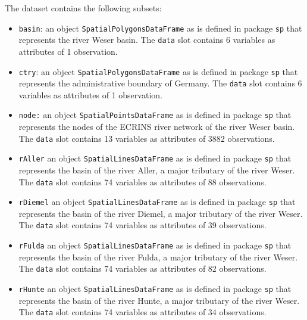 \documentclass{article}
\begin{document}
The dataset contains the following subsets:
\begin{itemize}
\item {\tt basin}: an object {\tt SpatialPolygonsDataFrame} as is defined in package {\tt sp} that represents the river Weser basin. The {\tt data} slot contains 6 variables as attributes of 1 observation.\\
	
\item {\tt ctry}: an object {\tt SpatialPolygonsDataFrame} as is defined in package {\tt sp} that represents the administrative boundary of Germany. The {\tt data} slot contains 6 variables as attributes of 1 observation.\\
	
\item {\tt node:} an object {\tt SpatialPointsDataFrame} as is defined in package {\tt sp} that represents the nodes of the ECRINS river network of the river Weser basin. The {\tt data} slot contains 13 variables as attributes of 3882 observations.\\
	
\item {\tt rAller} an object {\tt SpatialLinesDataFrame} as is defined in package {\tt sp} that represents the basin of the river Aller, a major tributary of the river Weser. The {\tt data} slot contains 74 variables as attributes of 88 observations.\\
	
\item {\tt rDiemel} an object {\tt SpatialLinesDataFrame} as is defined in package {\tt sp} that represents the basin of the river Diemel, a major tributary of the river Weser. The {\tt data} slot contains 74 variables as attributes of 39 observations.\\
	
\item {\tt rFulda} an object {\tt SpatialLinesDataFrame} as is defined in package {\tt sp} that represents the basin of the river Fulda, a major tributary of the river Weser. The {\tt data} slot contains 74 variables as attributes of 82 observations.\\
	
\item {\tt rHunte} an object {\tt SpatialLinesDataFrame} as is defined in package {\tt sp} that represents the basin of the river Hunte, a major tributary of the river Weser. The {\tt data} slot contains 74 variables as attributes of 34 observations.\\
	

\end{itemize}
\end{document}
